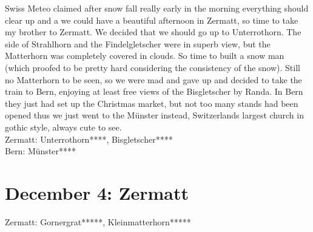 Swiss Meteo claimed after snow fall really early in the morning everything should clear up and a we could have a beautiful afternoon in Zermatt, so time to take my brother to Zermatt. We decided that we should go up to Unterrothorn. The side of Strahlhorn and the Findelgletscher were in superb view, but the Matterhorn was completely covered in clouds. So time to built a snow man (which proofed to be pretty hard considering the consistency of the snow). Still no Matterhorn to be seen, so we were mad and gave up and decided to take the train to Bern, enjoying at least free views of the Bisgletscher by Randa. In Bern they just had set up the Christmas market, but not too many stands had been opened thus we just went to the M\"unster instead, Switzerlands largest church in gothic style, always cute to see.\\

Zermatt: Unterrothorn****, Bisgletscher****\\
Bern: M\"unster****

\section{December 4: Zermatt}
\label{2010ZermattII}

Zermatt: Gornergrat*****, Kleinmatterhorn*****